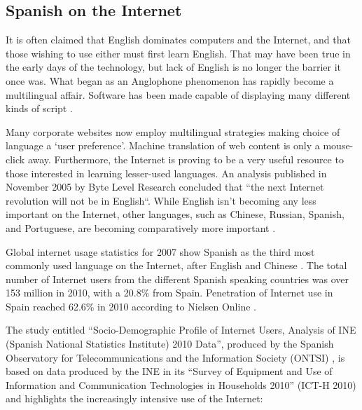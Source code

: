 \begin{multicols}{2}
\subsection{Spanish on the Internet}

It is often claimed that English dominates computers and the Internet, and that those wishing to use either must first learn English. That may have been true in the early days of the technology, but lack of English is no longer the barrier it once was. What began as an Anglophone phenomenon has rapidly become a multilingual affair. Software has been made capable of displaying many different kinds of script \cite{espanolred}.


Many corporate websites now employ multilingual strategies making choice of language a ‘user preference’. Machine translation of web content is only a mouse-click away. Furthermore, the Internet is proving to be a very useful resource to those interested in learning lesser-used languages. An analysis published in November 2005 by Byte Level Research concluded that “the next Internet revolution will not be in English“. While English isn’t becoming any less important on the Internet, other languages, such as Chinese, Russian, Spanish, and Portuguese, are becoming comparatively more important \cite{britishcouncil}.


Global internet usage statistics for 2007 show Spanish as the third most commonly used language on the Internet, after English and Chinese \cite{internetworldstats}. The total number of Internet users from the different Spanish speaking countries was over 153 million in 2010, with a 20.8\% from Spain. Penetration of Internet use in Spain reached 62.6\% in 2010 according to Nielsen Online \cite{nielsen}.

The study entitled “Socio-Demographic Profile of Internet Users, Analysis of INE (Spanish National Statistics Institute) 2010 Data”, produced by the Spanish Observatory for Telecommunications and the Information Society (ONTSI) \cite{ontsi}, is based on data produced by the INE in its “Survey of Equipment and Use of Information and Communication Technologies in Households 2010” (ICT-H 2010) and highlights the increasingly intensive use of the Internet:


\end{multicols}
